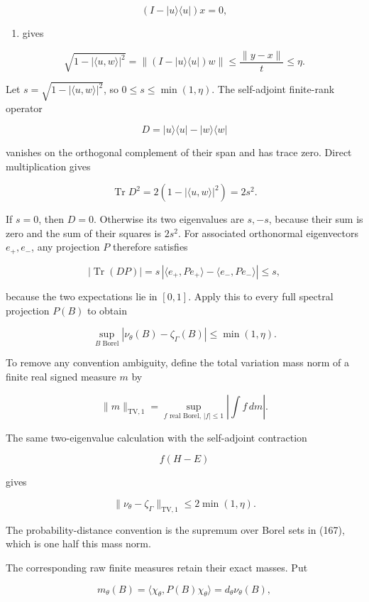 \documentclass[
  11pt,
]{article}
\providecommand{\tightlist}{%
  \setlength{\itemsep}{0pt}\setlength{\parskip}{0pt}}
\begin{document}
\[
 (I-|u\rangle\langle u|)x=0,
\]

\begin{enumerate}
\def\labelenumi{(\arabic{enumi})}
\setcounter{enumi}{162}
\tightlist
\item
  gives
\end{enumerate}

\[
 \sqrt{1-|\langle u,w\rangle|^2}
 =\|(I-|u\rangle\langle u|)w\|
 \le\frac{\|y-x\|}{t}\le\eta.
\tag{166}
\]

Let \(s=\sqrt{1-|\langle u,w\rangle|^2}\), so \(0\le s\le\min(1,\eta)\).
The self-adjoint finite-rank operator

\[
 D=|u\rangle\langle u|-|w\rangle\langle w|
\]

vanishes on the orthogonal complement of their span and has trace zero.
Direct multiplication gives

\[
 \operatorname{Tr}D^2=2(1-|\langle u,w\rangle|^2)=2s^2.
\]

If \(s=0\), then \(D=0\). Otherwise its two eigenvalues are \(s,-s\),
because their sum is zero and the sum of their squares is \(2s^2\). For
associated orthonormal eigenvectors \(e_+,e_-\), any projection \(P\)
therefore satisfies

\[
 |\operatorname{Tr}(DP)|
 =s\,|\langle e_+,Pe_+\rangle-\langle e_-,Pe_-\rangle|
 \le s,
\]

because the two expectations lie in \([0,1]\). Apply this to every full
spectral projection \(P(B)\) to obtain

\[
 \boxed{\sup_{B\text{ Borel}}|\nu_\theta(B)-\zeta_\Gamma(B)|
         \le\min(1,\eta).}
\tag{167}
\]

To remove any convention ambiguity, define the total variation mass norm
of a finite real signed measure \(m\) by

\[
 \|m\|_{\mathrm{TV},1}
 =\sup_{f\text{ real Borel},\,|f|\le1}\left|\int f\,dm\right|.
\]

The same two-eigenvalue calculation with the self-adjoint contraction

\[
 f(H-E)
\]

gives

\[
 \boxed{\|\nu_\theta-\zeta_\Gamma\|_{\mathrm{TV},1}
 \le2\min(1,\eta).}
\tag{168}
\]

The probability-distance convention is the supremum over Borel sets in
(167), which is one half this mass norm.

The corresponding raw finite measures retain their exact masses. Put

\[
 m_\theta(B)=\langle\chi_\theta,P(B)\chi_\theta\rangle
            =d_\theta\nu_\theta(B),
\]
\end{document}
